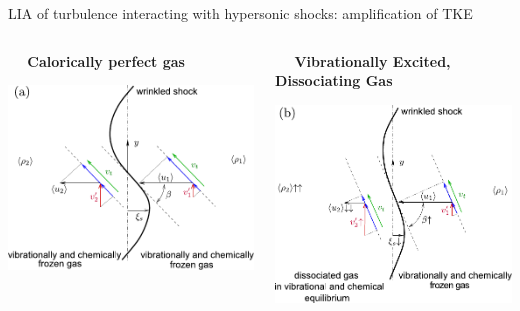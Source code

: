 \documentclass[9pt, aspectratio=1609]{beamer}
\begin{document}
\begin{frame}{\large LIA of turbulence interacting with hypersonic shocks: amplification of TKE}
\begin{columns}[c] 
    \begin{column}{.48\textwidth}%
    \vspace{-0.45cm}
    \begin{center}
        \vspace{-0.3cm}\textbf{$\quad$ Calorically perfect gas}\\ \vspace{0.3cm}
    \end{center}
     \includegraphics[width=1\textwidth]{figures/huete2021/sketch_tke_1.pdf}
    \end{column}%
    \begin{column}{.48\textwidth}
    \begin{center}
        \vspace{-0.3cm}\textbf{$\quad$ Vibrationally Excited, Dissociating Gas}\\ \vspace{0.3cm}
    \end{center}
    \includegraphics[width=1\textwidth]{figures/huete2021/sketch_tke_2.pdf}

\end{column}
\end{columns}
\end{frame}
\end{document}
